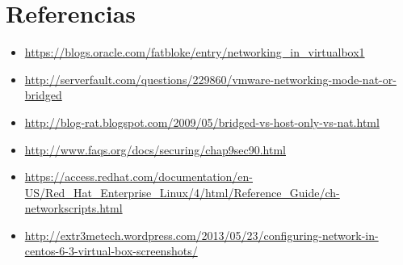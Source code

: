 \documentclass[11pt]{article}
\begin{document}
\section{Referencias}
	\begin{itemize}
		\item \url{https://blogs.oracle.com/fatbloke/entry/networking_in_virtualbox1}
		\item \url{http://serverfault.com/questions/229860/vmware-networking-mode-nat-or-bridged}
		\item \url{http://blog-rat.blogspot.com/2009/05/bridged-vs-host-only-vs-nat.html}
		\item \url{http://www.faqs.org/docs/securing/chap9sec90.html}
		\item \scriptsize \url{https://access.redhat.com/documentation/en-US/Red_Hat_Enterprise_Linux/4/html/Reference_Guide/ch-networkscripts.html}
		\item \scriptsize \url{http://extr3metech.wordpress.com/2013/05/23/configuring-network-in-centos-6-3-virtual-box-screenshots/}
	\end{itemize}
\end{document}

